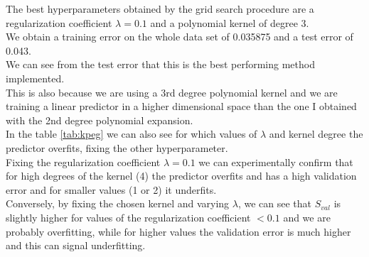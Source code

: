 % 
The best hyperparameters obtained by the grid search procedure are a regularization coefficient $\lambda = 0.1$ and a polynomial kernel of degree 3.\\
We obtain a training error on the whole data set of 0.035875 and a test error of 0.043.\\
We can see from the test error that this is the best performing method implemented.\\
This is also because we are using a 3rd degree polynomial kernel and we are training a linear predictor in a higher dimensional space than the one I obtained with the 2nd degree polynomial expansion.\\
In the table \ref{tab:kpeg} we can also see for which values of $\lambda$ and kernel degree the predictor overfits, fixing the other hyperparameter.\\
Fixing the regularization coefficient $\lambda = 0.1$ we can experimentally confirm that for high degrees of the kernel (4) the predictor overfits and has a high validation error and for smaller values (1 or 2) it underfits.\\
Conversely, by fixing the chosen kernel and varying $\lambda$, we can see that $S_{val}$ is slightly higher for values of the regularization coefficient $< 0.1$ and we are probably overfitting, while for higher values the validation error is much higher and this can signal underfitting.\\
